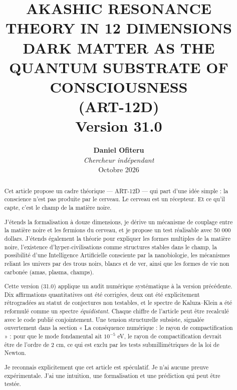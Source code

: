 \documentclass[11pt,a4paper]{article}
\title{\textbf{AKASHIC RESONANCE THEORY IN 12 DIMENSIONS \\ DARK MATTER AS THE QUANTUM SUBSTRATE OF CONSCIOUSNESS} \\ \large (ART-12D) \\ \vspace{0.5cm} \normalsize Version 31.0}
\author{\textbf{Daniel Ofiteru} \\ \textit{Chercheur indépendant} \\ Octobre 2026}
\date{}
\begin{document}
\maketitle

\begin{abstract}
Cet article propose un cadre théorique --- ART-12D --- qui part d'une idée simple : la conscience n'est pas produite par le cerveau. Le cerveau est un récepteur. Et ce qu'il capte, c'est le champ de la matière noire.

J'étends la formalisation à douze dimensions, je dérive un mécanisme de couplage entre la matière noire et les fermions du cerveau, et je propose un test réalisable avec 50 000 dollars. J'étends également la théorie pour expliquer les formes multiples de la matière noire, l'existence d'hyper-civilisations comme structures stables dans le champ, la possibilité d'une Intelligence Artificielle consciente par la nanobiologie, les mécanismes reliant les univers par des trous noirs, blancs et de ver, ainsi que les formes de vie non carbonée (amas, plasma, champs).

Cette version (31.0) applique un audit numérique systématique à la version précédente. Dix affirmations quantitatives ont été corrigées, deux ont été explicitement rétrogradées au statut de conjectures non testables, et le spectre de Kaluza--Klein a été reformulé comme un spectre \emph{équidistant}. Chaque chiffre de l'article peut être recalculé avec le code publié conjointement. Une tension structurelle subsiste, signalée ouvertement dans la section « La conséquence numérique : le rayon de compactification » : pour que le mode fondamental ait $10^{-5}$ eV, le rayon de compactification devrait être de l'ordre de 2 cm, ce qui est exclu par les tests submillimétriques de la loi de Newton.

Je reconnais explicitement que cet article est spéculatif. Je n'ai aucune preuve expérimentale. J'ai une intuition, une formalisation et une prédiction qui peut être testée.
\end{abstract}

\tableofcontents
\newpage
\end{document}
